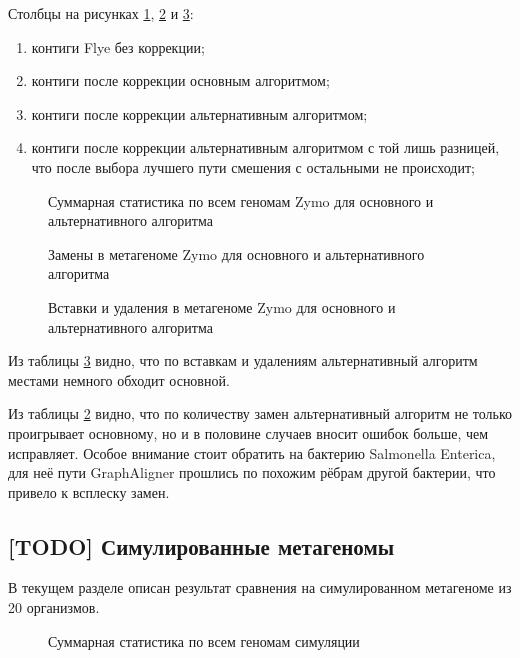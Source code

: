\documentclass[14pt]{matmex-diploma-custom}
\begin{document}
Столбцы на рисунках \ref{fig:general_mix}, \ref{fig:mismatches_mix} и \ref{fig:indels_mix}:
\begin{enumerate}
    \item контиги Flye без коррекции;
    \item контиги после коррекции основным алгоритмом;
    \item контиги после коррекции альтернативным алгоритмом;
    \item контиги после коррекции альтернативным алгоритмом с той лишь разницей, что после выбора лучшего пути смешения с остальными не происходит;
\end{enumerate}

\begin{figure}[h!]
    \centering
    
    \caption{Суммарная статистика по всем геномам Zymo для основного и альтернативного алгоритма}
    \label{fig:general_mix}
\end{figure}

\begin{figure}[h!]
    \centering
    
    \caption{Замены в метагеноме Zymo для основного и альтернативного алгоритма}
    \label{fig:mismatches_mix}
\end{figure}

\begin{figure}[h!]
    \centering
    
    \caption{Вставки и удаления в метагеноме Zymo для основного и альтернативного алгоритма}
    \label{fig:indels_mix}
\end{figure}

Из таблицы \ref{fig:indels_mix} видно, что по вставкам и удалениям альтернативный алгоритм местами немного обходит основной.

Из таблицы \ref{fig:mismatches_mix} видно, что по количеству замен альтернативный алгоритм не только проигрывает основному, но и в половине случаев вносит ошибок больше, чем исправляет. Особое внимание стоит обратить на бактерию Salmonella Enterica, для неё пути GraphAligner прошлись по похожим рёбрам другой бактерии, что привело к всплеску замен.


\subsection{[TODO] Симулированные метагеномы}
В текущем разделе описан результат сравнения на симулированном метагеноме из 20 организмов.

\begin{figure}[h!]
    
    \caption{Суммарная статистика по всем геномам симуляции}
    \label{fig:general_base20}
\end{figure}
\end{document}
